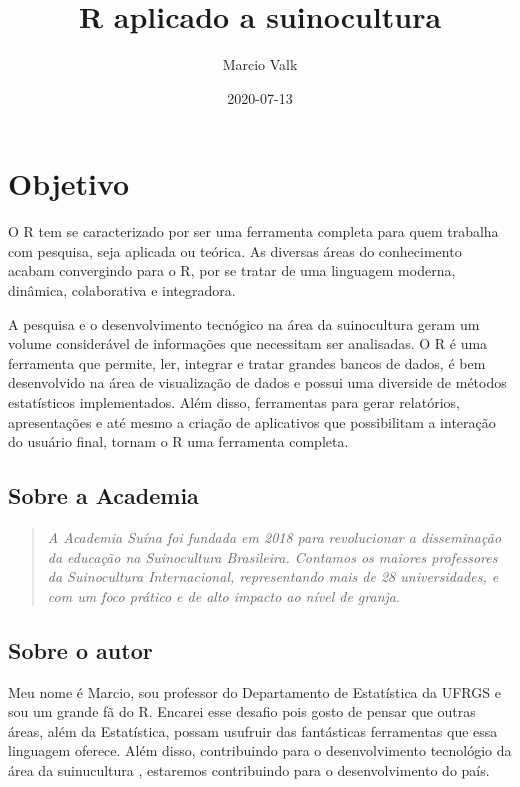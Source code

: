 \documentclass[
]{book}
\title{R aplicado a suinocultura}
\author{Marcio Valk}
\date{2020-07-13}
\begin{document}
\maketitle

{
\setcounter{tocdepth}{1}
\tableofcontents
}
\hypertarget{objetivo}{%
\chapter*{Objetivo}\label{objetivo}}

O R tem se caracterizado por ser uma ferramenta completa para quem trabalha com pesquisa, seja aplicada ou teórica. As diversas áreas do conhecimento acabam convergindo para o R, por se tratar de uma linguagem moderna, dinâmica, colaborativa e integradora.

A pesquisa e o desenvolvimento tecnógico na área da suinocultura geram um volume considerável de informações que necessitam ser analisadas. O R é uma ferramenta que permite, ler, integrar e tratar grandes bancos de dados, é bem desenvolvido na área de visualização de dados e possui uma diverside de métodos estatísticos implementados. Além disso, ferramentas para gerar relatórios, apresentações e até mesmo a criação de aplicativos que possibilitam a interação do usuário final, tornam o R uma ferramenta completa.

\hypertarget{sobre-a-academia}{%
\section*{Sobre a Academia}\label{sobre-a-academia}}

\begin{quote}
\emph{A Academia Suína foi fundada em 2018 para revolucionar a disseminação da educação na Suinocultura Brasileira. Contamos os maiores professores da Suinocultura Internacional, representando mais de 28 universidades, e com um foco prático e de alto impacto ao nível de granja}. \citep{academiasuina}
\end{quote}

\hypertarget{sobre-o-autor}{%
\section*{Sobre o autor}\label{sobre-o-autor}}

Meu nome é Marcio, sou professor do Departamento de Estatística da UFRGS e sou um grande fã do R. Encarei esse desafio pois gosto de pensar que outras áreas, além da Estatística, possam usufruir das fantásticas ferramentas que essa linguagem oferece. Além disso, contribuindo para o desenvolvimento tecnológio da área da suinucultura , estaremos contribuindo para o desenvolvimento do país.
\end{document}

